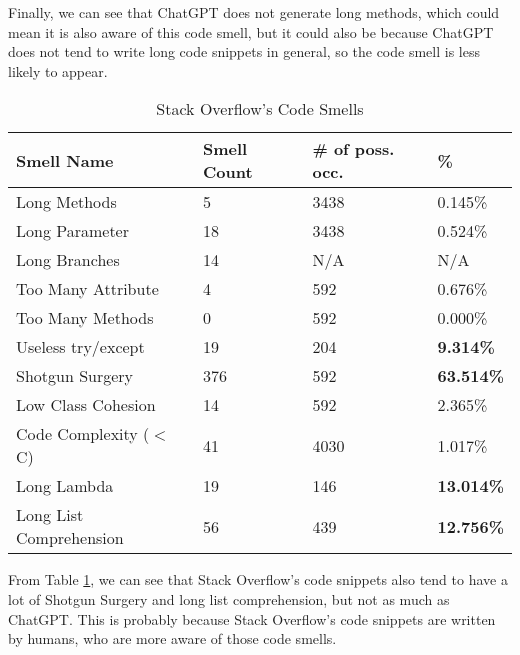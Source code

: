 Finally, we can see that ChatGPT does not generate long methods, which could mean it is also aware of this code smell, but it could also be because ChatGPT does not tend to write long code snippets in general, so the code smell is less likely to appear.

\begin{table}[!ht]
    \centering
    \caption{Stack Overflow's Code Smells}
    \begin{tabular}{llll}
        \hline
        \textbf{Smell Name}     & \textbf{Smell Count} & \textbf{\# of poss. occ.} & \textbf{\%}       \\ \hline
        Long Methods            & 5                    & 3438                      & 0.145\%           \\
        Long Parameter          & 18                   & 3438                      & 0.524\%           \\
        Long Branches           & 14                   & N/A                       & N/A               \\
        Too Many Attribute      & 4                    & 592                       & 0.676\%           \\
        Too Many Methods        & 0                    & 592                       & 0.000\%           \\
        Useless try/except      & 19                   & 204                       & \textbf{9.314\%}  \\
        Shotgun Surgery         & 376                  & 592                       & \textbf{63.514\%} \\
        Low Class Cohesion      & 14                   & 592                       & 2.365\%           \\
        Code Complexity ($<$ C) & 41                   & 4030                      & 1.017\%           \\
        Long Lambda             & 19                   & 146                       & \textbf{13.014\%} \\
        Long List Comprehension & 56                   & 439                       & \textbf{12.756\%} \\ \hline
    \end{tabular}
    \label{table:result-so}
\end{table}

From Table \ref{table:result-so}, we can see that Stack Overflow's code snippets also tend to have a lot of Shotgun Surgery and long list comprehension, but not as much as ChatGPT. This is probably because Stack Overflow's code snippets are written by humans, who are more aware of those code smells.

